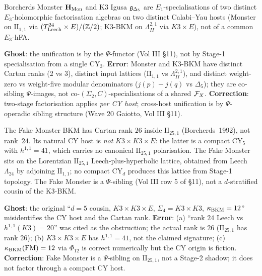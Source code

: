 \begin{corollary}\ClaimStatusHealed
\label{wn:cor:healed-many-bkms}
Borcherds Monster $\mathbf{H}_{\mathrm{Mon}}$ and K3 Igusa $\mathfrak{g}_{\Delta_5}$ are $E_1$-specialisations of two distinct $E_3$-holomorphic factorisation algebras on two distinct Calabi--Yau hosts (Monster on $\mathrm{II}_{1,1}$ via $(T^{24}_{\mathrm{Leech}} \times E)/(\mathbb{Z}/2)$; K3-BKM on $\Lambda^{2,1}_{II}$ via $K3 \times E$), not of a common $E_3$-hFA.
\end{corollary}

\textbf{Ghost}: the unification is by the $\Psi$-functor (Vol III \S11), not by Stage-1 specialisation from a single CY$_3$. \textbf{Error}: Monster and K3-BKM have distinct Cartan ranks (2 vs 3), distinct input lattices ($\mathrm{II}_{1,1}$ vs $\Lambda^{2,1}_{II}$), and distinct weight-zero vs weight-five modular denominators ($j(p)-j(q)$ vs $\Delta_5$); they are co-sibling $\Psi$-images, not co-$(\Sigma_2, C)$-specialisations of a shared $\mathcal{F}_X$. \textbf{Correction}: two-stage factorisation applies \emph{per CY host}; cross-host unification is by $\Psi$-operadic sibling structure (Wave 20 Gaiotto, Vol III \S11).

\begin{remark}\ClaimStatusCorrected
\label{wn:rmk:healed-fake-monster}
The Fake Monster BKM has Cartan rank $26$ inside $\mathrm{II}_{25, 1}$ (Borcherds~1992), not rank~$24$. Its natural CY host is \emph{not} $K3 \times K3 \times E$: the latter is a compact CY$_5$ with $h^{1,1} = 41$, which carries no canonical $\mathrm{II}_{25, 1}$ polarisation. The Fake Monster sits on the Lorentzian $\mathrm{II}_{25, 1}$ Leech-plus-hyperbolic lattice, obtained from Leech $\Lambda_{24}$ by adjoining $\mathrm{II}_{1, 1}$; no compact CY$_d$ produces this lattice from Stage-1 topology. The Fake Monster is a $\Psi$-sibling (Vol III row 5 of \S11), not a $d$-stratified cousin of the K3-BKM.
\end{remark}

\textbf{Ghost}: the original ``$d = 5$ cousin, $K3 \times K3 \times E$, $\Sigma_4 = K3 \times K3$, $\kappa_{\mathrm{BKM}} = 12$'' misidentifies the CY host and the Cartan rank. \textbf{Error}: (a) ``rank $24$ Leech vs $h^{1,1}(K3) = 20$'' was cited as the obstruction; the actual rank is $26$ ($\mathrm{II}_{25, 1}$ has rank 26); (b) $K3 \times K3 \times E$ has $h^{1,1} = 41$, not the claimed signature; (c) $\kappa_{\mathrm{BKM}}(\mathrm{FM}) = 12$ via $\Phi_{12}$ is correct numerically but the CY origin is fiction. \textbf{Correction}: Fake Monster is a $\Psi$-sibling on $\mathrm{II}_{25, 1}$, not a Stage-2 shadow; it does not factor through a compact CY host.

